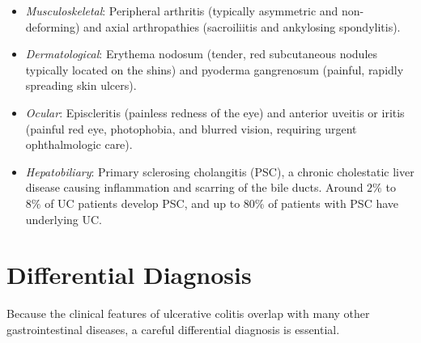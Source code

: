 \begin{itemize}
  \begin{itemize}
    \item \textit{Musculoskeletal}: Peripheral arthritis (typically asymmetric and non-deforming) and axial arthropathies (sacroiliitis and ankylosing spondylitis).
    \item \textit{Dermatological}: Erythema nodosum (tender, red subcutaneous nodules typically located on the shins) and pyoderma gangrenosum (painful, rapidly spreading skin ulcers).
    \item \textit{Ocular}: Episcleritis (painless redness of the eye) and anterior uveitis or iritis (painful red eye, photophobia, and blurred vision, requiring urgent ophthalmologic care).
    \item \textit{Hepatobiliary}: Primary sclerosing cholangitis (PSC), a chronic cholestatic liver disease causing inflammation and scarring of the bile ducts. Around $2\%$ to $8\%$ of UC patients develop PSC, and up to $80\%$ of patients with PSC have underlying UC.
  \end{itemize}
\end{itemize}

\section*{Differential Diagnosis}
Because the clinical features of ulcerative colitis overlap with many other gastrointestinal diseases, a careful differential diagnosis is essential.

